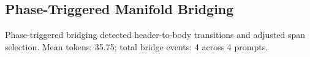 \subsection{Phase-Triggered Manifold Bridging}
Phase-triggered bridging detected header-to-body transitions and adjusted span selection.
Mean tokens: 35.75; total bridge events: 4 across 4 prompts.
